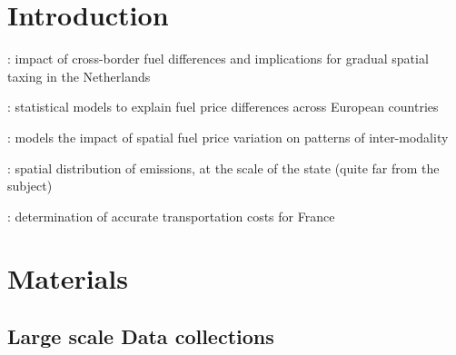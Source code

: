 \documentclass[3p,times,procedia]{elsarticle}
\begin{document}




\section{Introduction}
\label{main}



\cite{rietveld2001spatial} : impact of cross-border fuel differences and implications for gradual spatial taxing in the Netherlands

\cite{rietveld2005fuel} : statistical models to explain fuel price differences across European countries

\cite{macharis2010decision} : models the impact of spatial fuel price variation on patterns of inter-modality

\cite{gregg2009temporal} : spatial distribution of emissions, at the scale of the state (quite far from the subject)

\cite{combes2005transport} : determination of accurate transportation costs for France






\section{Materials}

\subsection{Large scale Data collections}
\end{document}
